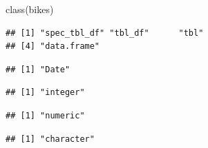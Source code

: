 \documentclass[
]{krantz}
\makeatletter
\newenvironment{Shaded}{\begin{snugshade}}{\end{snugshade}}
\newcommand{\FunctionTok}[1]{\textcolor[rgb]{0,0,0}{#1}}
\newcommand{\NormalTok}[1]{#1}
\newcommand{\SpecialCharTok}[1]{\textcolor[rgb]{0,0,0}{#1}}
\newenvironment{kframe}{%
\medskip{}
\setlength{\fboxsep}{.8em}
 \def\at@end@of@kframe{}%
 \ifinner\ifhmode%
  \def\at@end@of@kframe{\end{minipage}}%
  \begin{minipage}{\columnwidth}%
 \fi\fi%
 \def\FrameCommand##1{\hskip\@totalleftmargin \hskip-\fboxsep
 \colorbox{shadecolor}{##1}\hskip-\fboxsep
     \hskip-\linewidth \hskip-\@totalleftmargin \hskip\columnwidth}%
 \MakeFramed {\advance\hsize-\width
   \@totalleftmargin\z@ \linewidth\hsize
   \@setminipage}}%
 {\par\unskip\endMakeFramed%
 \at@end@of@kframe}
\renewenvironment{Shaded}{\begin{kframe}}{\end{kframe}}
\makeatother
\begin{document}
\begin{Shaded}
\begin{Highlighting}[]
\FunctionTok{class}\NormalTok{(bikes)}
\end{Highlighting}
\end{Shaded}

\begin{verbatim}
## [1] "spec_tbl_df" "tbl_df"      "tbl"        
## [4] "data.frame"
\end{verbatim}

\begin{Shaded}
\end{Shaded}

\begin{verbatim}
## [1] "Date"
\end{verbatim}

\begin{Shaded}
\end{Shaded}

\begin{verbatim}
## [1] "integer"
\end{verbatim}

\begin{Shaded}
\end{Shaded}

\begin{verbatim}
## [1] "numeric"
\end{verbatim}

\begin{Shaded}
\end{Shaded}

\begin{verbatim}
## [1] "character"
\end{verbatim}

\begin{Shaded}
\end{Shaded}
\end{document}
